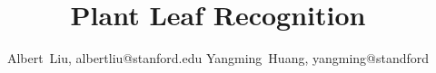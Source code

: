 \documentclass[journal]{IEEEtran}
\begin{document}
%
\title{Plant Leaf Recognition}
%
%
%
\author{Albert~Liu, albertliu@stanford.edu
        Yangming~Huang, yangming@standford}%

%
%


\maketitle


\end{document}
